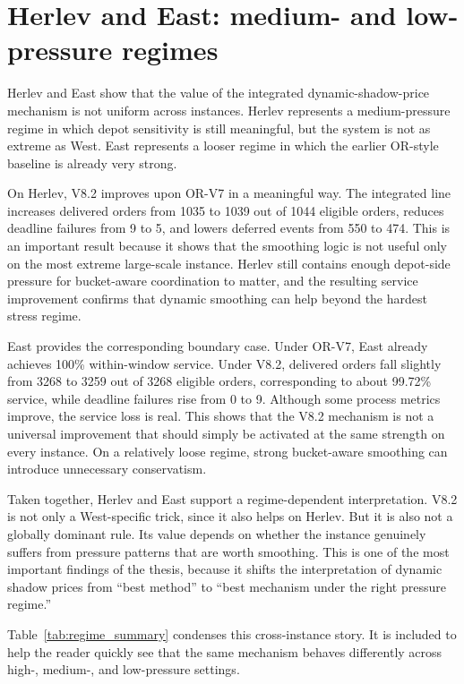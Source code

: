 \section{Herlev and East: medium- and low-pressure regimes}

Herlev and East show that the value of the integrated dynamic-shadow-price mechanism is not uniform across instances. Herlev represents a medium-pressure regime in which depot sensitivity is still meaningful, but the system is not as extreme as West. East represents a looser regime in which the earlier OR-style baseline is already very strong.

On Herlev, V8.2 improves upon OR-V7 in a meaningful way. The integrated line increases delivered orders from 1035 to 1039 out of 1044 eligible orders, reduces deadline failures from 9 to 5, and lowers deferred events from 550 to 474. This is an important result because it shows that the smoothing logic is not useful only on the most extreme large-scale instance. Herlev still contains enough depot-side pressure for bucket-aware coordination to matter, and the resulting service improvement confirms that dynamic smoothing can help beyond the hardest stress regime.

East provides the corresponding boundary case. Under OR-V7, East already achieves 100\% within-window service. Under V8.2, delivered orders fall slightly from 3268 to 3259 out of 3268 eligible orders, corresponding to about 99.72\% service, while deadline failures rise from 0 to 9. Although some process metrics improve, the service loss is real. This shows that the V8.2 mechanism is not a universal improvement that should simply be activated at the same strength on every instance. On a relatively loose regime, strong bucket-aware smoothing can introduce unnecessary conservatism.

Taken together, Herlev and East support a regime-dependent interpretation. V8.2 is not only a West-specific trick, since it also helps on Herlev. But it is also not a globally dominant rule. Its value depends on whether the instance genuinely suffers from pressure patterns that are worth smoothing. This is one of the most important findings of the thesis, because it shifts the interpretation of dynamic shadow prices from ``best method'' to ``best mechanism under the right pressure regime.'' 

Table~\ref{tab:regime_summary} condenses this cross-instance story. It is included to help the reader quickly see that the same mechanism behaves differently across high-, medium-, and low-pressure settings.

